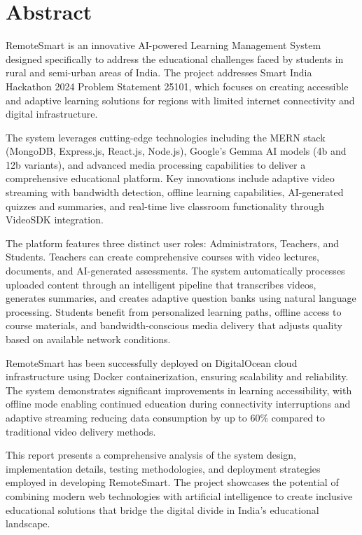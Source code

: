 \documentclass[12pt,a4paper]{report}
\begin{document}
\newpage
\chapter*{Abstract}

RemoteSmart is an innovative AI-powered Learning Management System designed specifically to address the educational challenges faced by students in rural and semi-urban areas of India. The project addresses Smart India Hackathon 2024 Problem Statement 25101, which focuses on creating accessible and adaptive learning solutions for regions with limited internet connectivity and digital infrastructure.

The system leverages cutting-edge technologies including the MERN stack (MongoDB, Express.js, React.js, Node.js), Google's Gemma AI models (4b and 12b variants), and advanced media processing capabilities to deliver a comprehensive educational platform. Key innovations include adaptive video streaming with bandwidth detection, offline learning capabilities, AI-generated quizzes and summaries, and real-time live classroom functionality through VideoSDK integration.

The platform features three distinct user roles: Administrators, Teachers, and Students. Teachers can create comprehensive courses with video lectures, documents, and AI-generated assessments. The system automatically processes uploaded content through an intelligent pipeline that transcribes videos, generates summaries, and creates adaptive question banks using natural language processing. Students benefit from personalized learning paths, offline access to course materials, and bandwidth-conscious media delivery that adjusts quality based on available network conditions.

RemoteSmart has been successfully deployed on DigitalOcean cloud infrastructure using Docker containerization, ensuring scalability and reliability. The system demonstrates significant improvements in learning accessibility, with offline mode enabling continued education during connectivity interruptions and adaptive streaming reducing data consumption by up to 60\% compared to traditional video delivery methods.

This report presents a comprehensive analysis of the system design, implementation details, testing methodologies, and deployment strategies employed in developing RemoteSmart. The project showcases the potential of combining modern web technologies with artificial intelligence to create inclusive educational solutions that bridge the digital divide in India's educational landscape.
\end{document}
